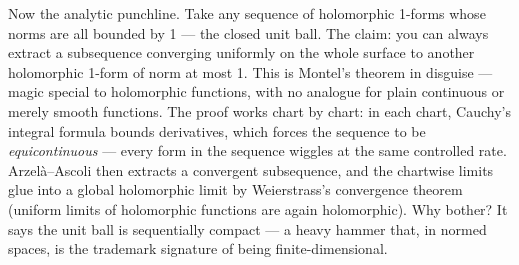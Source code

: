 \begin{layman}
Now the analytic punchline. Take any sequence of holomorphic 1-forms
whose norms are all bounded by 1 — the closed unit ball. The claim: you
can always extract a subsequence converging uniformly on the whole
surface to another holomorphic 1-form of norm at most 1. This is Montel's
theorem in disguise — magic special to holomorphic functions, with no
analogue for plain continuous or merely smooth functions. The proof works
chart by chart: in each chart, Cauchy's integral formula bounds
derivatives, which forces the sequence to be \emph{equicontinuous} — every
form in the sequence wiggles at the same controlled rate. Arzelà–Ascoli
then extracts a convergent subsequence, and the chartwise limits glue
into a global holomorphic limit by Weierstrass's convergence theorem
(uniform limits of holomorphic functions are again holomorphic). Why
bother? It says the unit ball is sequentially compact — a heavy hammer
that, in normed spaces, is the trademark signature of being
finite-dimensional.
\end{layman}


